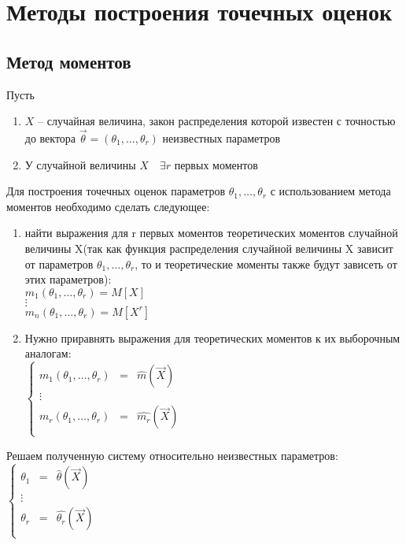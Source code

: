 \documentclass[a4paper, 12pt]{article}
\theoremstyle{definition}
\theoremstyle{leads}
\theoremstyle{example}
\begin{document}
\section{Методы построения точечных оценок}
\subsection{Метод моментов}
Пусть 
\begin{enumerate}
	\item $X$ -- случайная величина, закон распределения которой известен с точностью до вектора $\vec{\theta} = (\theta_1, \dots, \theta_r)$ неизвестных параметров
	\item У случайной величины $X \quad \exists r$ первых моментов  
\end{enumerate}
Для построения точечных оценок параметров $\theta_1, \dots, \theta_r$ с использованием метода моментов необходимо сделать следующее: 
\begin{enumerate}
	\item найти выражения для r первых моментов теоретических моментов случайной величины X(так как функция распределения случайной величины X зависит от параметров $\theta_1, \dots, \theta_r$, то и теоретические моменты также будут зависеть от этих параметров):\\
	$m_1(\theta_1, \dots, \theta_r) = M[X]$\\
	$\vdots$\\
	$m_n(\theta_1, \dots, \theta_r) = M[X^r]$
	
	\item Нужно приравнять выражения для теоретических моментов к их выборочным аналогам:\\
	 $\left \{
	 \begin{array}{ccc}
	 	m_1(\theta_1, \dots, \theta_r)& = &\hat{m}(\vec{X})\\
	 	\vdots\\
	 	m_r(\theta_1, \dots, \theta_r) &= &\hat{m_r}(\vec{X})\\
	 \end{array}
	 \right.$
\end{enumerate}
Решаем полученную систему относительно неизвестных параметров:\\
	 $\left \{
\begin{array}{ccc}
\theta_1 & = &\hat{\theta}(\vec{X})\\
\vdots\\
\theta_r &= &\hat{\theta_r}(\vec{X})\\
\end{array}
\right.$
\end{document}
